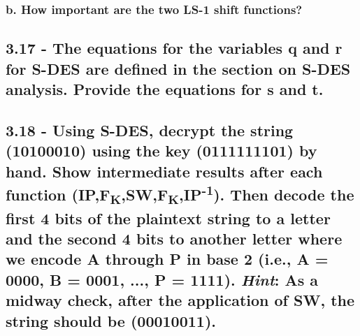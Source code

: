 \documentclass[
    article,            %
    11pt,               %
    oneside,            %
    a4paper,            %
    english,            %
    brazil,             %
    sumario=tradicional,
    ]{abntex2}
\begin{document}
\subsubsection*{b. How important are the two LS-1 shift functions?}

\subsection*{\textbf{3.17 - The equations for the variables q and r for S-DES are defined in the section on S-DES analysis. Provide the equations for s and t.}}


\subsection*{\textbf{3.18 - Using S-DES, decrypt the string (10100010) using the key (0111111101) by hand. Show intermediate results after each function (IP,F\textsubscript{K},SW,F\textsubscript{K},IP\textsuperscript{-1}). Then decode the first 4 bits of the plaintext string to a letter and the second 4 bits to another letter where we encode A through P in base 2 (i.e., A = 0000, B = 0001, ..., P = 1111). \textit{Hint}: As a midway check, after the application of SW, the string should be (00010011).}}



% 


\postextual

\nocite{Stallings:2005:CNS:1076613}
\nocite{Stallings:2010:CNS:1824151}

\end{document}
